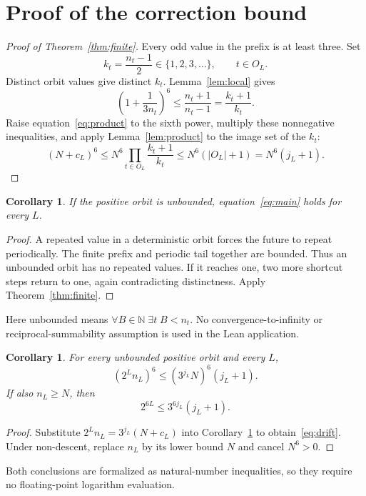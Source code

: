 \documentclass[11pt]{article}
\newtheorem{corollary}[theorem]{Corollary}
\begin{document}
\section{Proof of the correction bound}
\begin{proof}[Proof of Theorem~\ref{thm:finite}]
Every odd value in the prefix is at least three. Set
\[
k_t=\frac{n_t-1}{2}\in\{1,2,3,\ldots\},\qquad t\in O_L.
\]
Distinct orbit values give distinct $k_t$. Lemma~\ref{lem:local} gives
\[
\left(1+\frac1{3n_t}\right)^6
\le\frac{n_t+1}{n_t-1}=\frac{k_t+1}{k_t}.
\]
Raise equation~\eqref{eq:product} to the sixth power, multiply these nonnegative inequalities, and apply Lemma~\ref{lem:product} to the image set of the $k_t$:
\[
(N+c_L)^6
\le N^6\prod_{t\in O_L}\frac{k_t+1}{k_t}
\le N^6(|O_L|+1)=N^6(j_L+1).
\]
\end{proof}

\begin{corollary}\label{cor:unbounded}
If the positive orbit is unbounded, equation~\eqref{eq:main} holds for every $L$.
\end{corollary}
\begin{proof}
A repeated value in a deterministic orbit forces the future to repeat periodically. The finite prefix and periodic tail together are bounded. Thus an unbounded orbit has no repeated values. If it reaches one, two more shortcut steps return to one, again contradicting distinctness. Apply Theorem~\ref{thm:finite}.
\end{proof}
Here unbounded means $\forall B\in\mathbb N\;\exists t\; B<n_t$. No convergence-to-infinity or reciprocal-summability assumption is used in the Lean application.

\begin{corollary}\label{cor:drift}
For every unbounded positive orbit and every $L$,
\begin{equation}\label{eq:drift}
(2^L n_L)^6\le(3^{j_L}N)^6(j_L+1).
\end{equation}
If also $n_L\ge N$, then
\begin{equation}\label{eq:nondescent}
2^{6L}\le3^{6j_L}(j_L+1).
\end{equation}
\end{corollary}
\begin{proof}
Substitute $2^Ln_L=3^{j_L}(N+c_L)$ into Corollary~\ref{cor:unbounded} to obtain~\eqref{eq:drift}. Under non-descent, replace $n_L$ by its lower bound $N$ and cancel $N^6>0$.
\end{proof}
Both conclusions are formalized as natural-number inequalities, so they require no floating-point logarithm evaluation.
\end{document}
